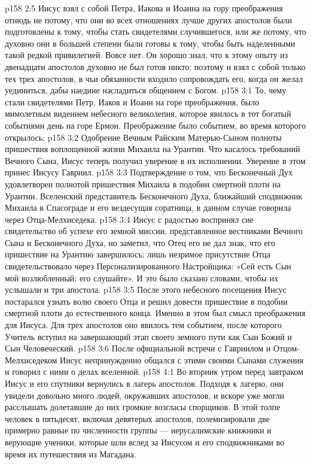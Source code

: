 \vs p158 2:5 Иисус взял с собой Петра, Иакова и Иоанна на гору преображения отнюдь не потому, что они во всех отношениях лучше других апостолов были подготовлены к тому, чтобы стать свидетелями случившегося, или же потому, что духовно они в большей степени были готовы к тому, чтобы быть наделенными такой редкой привилегией. Вовсе нет. Он хорошо знал, что к этому опыту из двенадцати апостолов духовно не был готов никто; поэтому и взял с собой только тех трех апостолов, в чьи обязанности входило сопровождать его, когда он желал уединиться, дабы наедине насладиться общением с Богом.
\vs p158 3:1 То, чему стали свидетелями Петр, Иаков и Иоанн на горе преображения, было мимолетным видением небесного великолепия, которое явилось в тот богатый событиями день на горе Ермон. Преображение было событием, во время которого открылось:
\vs p158 3:2 \bibnobreakspace Одобрение Вечным Райским Матерью\hyp{}Сыном полноты пришествия воплощенной жизни Михаила на Урантии. Что касалось требований Вечного Сына, Иисус теперь получил уверение в их исполнении. Уверение в этом принес Иисусу Гавриил.
\vs p158 3:3 \pc {}\bibnobreakspace Подтверждение о том, что Бесконечный Дух удовлетворен полнотой пришествия Михаила в подобии смертной плоти на Урантии. Вселенский представитель Бесконечного Духа, ближайший сподвижник Михаила в Спасограде и его вездесущая соратница, в данном случае говорила через Отца\hyp{}Мелхиседека.
\vs p158 3:4 \pc Иисус с радостью воспринял сие свидетельство об успехе его земной миссии, представленное вестниками Вечного Сына и Бесконечного Духа, но заметил, что Отец его не дал знак, что его пришествие на Урантию завершилось; лишь незримое присутствие Отца свидетельствовало через Персонализированного Настройщика: «Сей есть Сын мой возлюбленный; его слушайте». И это было сказано словами, чтобы их услышали и три апостола.
\vs p158 3:5 После этого небесного посещения Иисус постарался узнать волю своего Отца и решил довести пришествие в подобии смертной плоти до естественного конца. Именно в этом был смысл преображения для Иисуса. Для трех апостолов оно явилось тем событием, после которого Учитель вступил на завершающий этап своего земного пути как Сын Божий и Сын Человеческий.
\vs p158 3:6 После официальной встречи с Гавриилом и Отцом\hyp{}Мелхиседеком Иисус непринужденно общался с этими своими Сынами служения и говорил с ними о делах вселенной.
\vs p158 4:1 Во вторник утром перед завтраком Иисус и его спутники вернулись в лагерь апостолов. Подходя к лагерю, они увидели довольно много людей, окружавших апостолов, и вскоре уже могли расслышать долетавшие до них громкие возгласы спорщиков. В этой толпе человек в пятьдесят, включая девятерых апостолов, полемизировали две примерно равные по численности группы --- иерусалимские книжники и верующие ученики, которые шли вслед за Иисусом и его сподвижниками во время их путешествия из Магадана.
